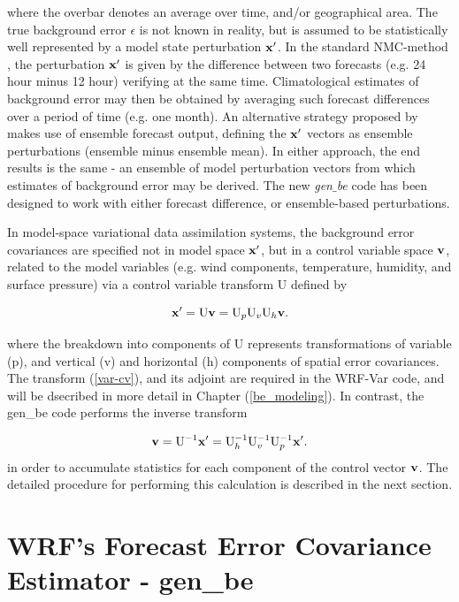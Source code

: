 \noindent where the overbar denotes an average over time, and/or geographical area. The true background error $\epsilon$ is not known in reality, but is assumed to be statistically well represented by a model state perturbation ${\bf x'}$. In the standard NMC-method \citep{parrish92}, the perturbation ${\bf x'}$ is given by the difference between two forecasts (e.g. 24 hour minus 12 hour) verifying at the same time. Climatological estimates of background error may then be obtained by averaging such forecast differences over a period of time (e.g. one month). An alternative strategy proposed by \citep{fisher03} makes use of ensemble forecast output, defining the ${\bf x'}$ vectors as ensemble perturbations (ensemble minus ensemble mean). In either approach, the end results is the same  - an ensemble of model perturbation vectors from which estimates of background error may be derived. The new {\it gen$\_$be} code has been designed to work with either forecast difference, or ensemble-based perturbations.

In model-space variational data assimilation systems, the background error covariances are specified not in model space ${\bf x'}$, but in a control variable space ${\bf v}$, related to the model variables (e.g. wind components, temperature, humidity, and surface pressure) via a control variable transform U defined by

\begin{equation}
{\bf x'} = {\rm U}{\bf v}= {\rm U}_{p} {\rm U}_{v} {\rm U}_{h}{\bf v}.
\label{var-cv}
\end{equation}

where the breakdown into components of U represents transformations of variable (p), and vertical (v) and horizontal (h) components of spatial error covariances. The transform (\ref{var-cv}), and its adjoint are required in the WRF-Var code, and will be dsecribed in more detail in Chapter (\ref{be_modeling}). In contrast, the gen\_be code performs the inverse transform

\begin{equation}
{\bf v} = {\rm U}^{-1}{\bf x'}= {\rm U}^{-1}_{h} {\rm U}^{-1}_{v} {\rm U}^{-1}_{p} {\bf x'}.
\label{var-cv-inv}
\end{equation}
in order to accumulate statistics for each component of the control vector $\bf v$. The detailed procedure for performing this calculation is described in the next section.


\section{WRF's Forecast Error Covariance Estimator - gen\_be}
\label{gen_be_sub}

